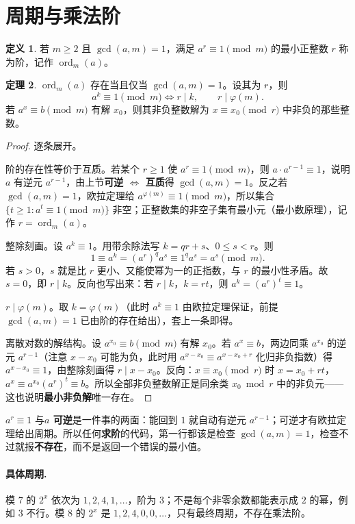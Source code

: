 \documentclass[UTF8,a4paper,11pt,twoside,openright,fontset=fandol]{ctexbook}
\theoremstyle{definition}
\newtheorem{definition}{定义}[chapter]
\newtheorem{theorem}[definition]{定理}
\newcommand{\ord}{\operatorname{ord}}
\begin{document}
\section{周期与乘法阶}
\begin{definition}
若 $m\ge2$ 且 $\gcd(a,m)=1$，满足 $a^r\equiv1\pmod m$ 的最小正整数 $r$ 称为阶，记作 $\ord_m(a)$。
\end{definition}
\begin{theorem}
$\ord_m(a)$ 存在当且仅当 $\gcd(a,m)=1$。设其为 $r$，则
\[
 a^k\equiv1\pmod m\iff r\mid k,\qquad r\mid\varphi(m).
\]
若 $a^x\equiv b\pmod m$ 有解 $x_0$，则其非负整数解为 $x\equiv x_0\pmod r$ 中非负的那些整数。
\end{theorem}
\begin{proof}
逐条展开。

阶的存在性等价于互质。若某个 $r\ge1$ 使 $a^r\equiv1\pmod m$，则 $a\cdot a^{r-1}\equiv1$，说明 $a$ 有逆元 $a^{r-1}$，由上节\textbf{可逆 $\iff$ 互质}得 $\gcd(a,m)=1$。反之若 $\gcd(a,m)=1$，欧拉定理给 $a^{\varphi(m)}\equiv1\pmod m$，所以集合 $\{t\ge1:a^t\equiv1\pmod m\}$ 非空；正整数集的非空子集有最小元（最小数原理），记作 $r=\ord_m(a)$。

整除刻画。设 $a^k\equiv1$。用带余除法写 $k=qr+s$、$0\le s<r$。则
\[
 1\equiv a^k=(a^r)^qa^s\equiv1^q a^s=a^s\pmod m.
\]
若 $s>0$，$s$ 就是比 $r$ 更小、又能使幂为一的正指数，与 $r$ 的最小性矛盾。故 $s=0$，即 $r\mid k$。反向也写出来：若 $r\mid k$，$k=rt$，则 $a^k=(a^r)^t\equiv1$。

$r\mid\varphi(m)$。取 $k=\varphi(m)$（此时 $a^k\equiv1$ 由欧拉定理保证，前提 $\gcd(a,m)=1$ 已由阶的存在给出），套上一条即得。

离散对数的解结构。设 $a^{x_0}\equiv b\pmod m$ 有解 $x_0$。若 $a^x\equiv b$，两边同乘 $a^{x_0}$ 的逆元 $a^{r-1}$（注意 $x-x_0$ 可能为负，此时用 $a^{x-x_0}\equiv a^{x-x_0+r}$ 化归非负指数）得 $a^{x-x_0}\equiv1$，由整除刻画得 $r\mid x-x_0$。反向：$x\equiv x_0\pmod r$ 时 $x=x_0+rt$，$a^x\equiv a^{x_0}(a^r)^t\equiv b$。所以全部非负整数解正是同余类 $x_0\bmod r$ 中的非负元——这也说明\textbf{最小非负解}唯一存在。
\end{proof}

\begin{tip}[为什么：求阶前先查 $\gcd(a,m)=1$]
$a^r\equiv1$ 与\textbf{$a$ 可逆}是一件事的两面：能回到 $1$ 就自动有逆元 $a^{r-1}$；可逆才有欧拉定理给出周期。所以任何\textbf{求阶}的代码，第一行都该是检查 $\gcd(a,m)=1$，检查不过就报\textbf{不存在}，而不是返回一个错误的最小值。
\end{tip}


\paragraph{具体周期.} 模 $7$ 的 $2^x$ 依次为 $1,2,4,1,\ldots$，阶为 $3$；不是每个非零余数都能表示成 $2$ 的幂，例如 $3$ 不行。模 $8$ 的 $2^x$ 是 $1,2,4,0,0,\ldots$，只有最终周期，不存在乘法阶。
\end{document}
